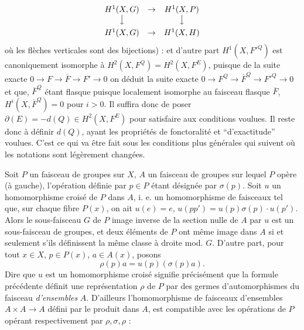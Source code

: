 
\[
\begin{array}{ccc}
H^1(X,G)&\to&H^1(X,P)\\
\big\downarrow&&\big\downarrow\\[0.45em]
H^1(X,G)&\to&H^1(X,H)
\end{array}
\]
où les flèches verticales sont des bijections) : et d'autre part
$H^1(X,{F'}^Q)$ est canoniquement isomorphe à
$H^2(X,F^Q)=H^2(X,F^E)$, puisque de la suite exacte
$0\to F\to\overline F\to F'\to0$
on déduit la suite exacte
$0\to F^Q\to\overline F^Q\to {F'}^Q\to0$
et que, $\overline F^Q$ étant flasque puisque localement isomorphe au faisceau
flasque $\overline F$, $H^i(X,\overline F^Q)=0$ pour $i>0$.
Il suffira donc de poser
$\partial(E)=-d(Q)\in H^2(X,F^E)$
pour satisfaire aux conditions voulues. Il reste donc à définir $d(Q)$, ayant
les propriétés de fonctoralité et ``d'exactitude'' voulues. C'est ce qui
va être fait sous les conditions plus générales qui suivent où les notations
sont légèrement changées.

Soit $P$ un faisceau de groupes sur $X$, $A$ un faisceau de groupes sur lequel
$P$ opère (à gauche), l'opération définie par $p\in P$ étant désignée par
$\sigma(p)$. Soit $u$ un homomorphisme croisé de $P$ dans $A$, i. e. un
homomorphisme de faisceaux tel que, sur chaque fibre $P(x)$, on ait $u(e)=e$,
$u(pp')=u(p)\sigma(p)\mathbin{\cdot}u(p')$. Alors le sous-faisceau $G$ de $P$
image inverse de la section nulle de $A$ par $u$ est un sous-faisceau de
groupes, et deux éléments de $P$ ont même image dans $A$ si et seulement s'ils
définissent la même classe à droite mod. $G$.
D'autre part, pour tout $x\in X$, $p\in P(x)$, $a\in A(x)$, posons
\[
\rho(p)a=u(p)(\sigma(p)a).
\]
Dire que $u$ est un homomorphisme croisé signifie précisément que la formule
précédente définit une représentation $\rho$ de $P$ par des germes
d'automorphismes du faisceau \textit{d'ensembles} $A$. D'ailleurs
l'homomorphisme de faisceaux d'ensembles
$A\times A\to A$ défini par le produit dans $A$, est compatible
avec les opérations de $P$ opérant respectivement par $\rho,\sigma,\rho$ :

